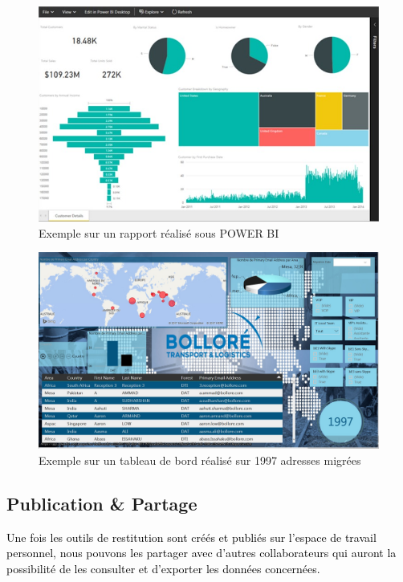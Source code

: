 \documentclass[a4paper,12pt]{report}
\begin{document}
\begin{figure}[H]
	\begin{center}
		\includegraphics[width=1\linewidth]{Projet_O365/rapport_bi}
\end{center}
	\caption{Exemple sur un rapport réalisé sous POWER BI }
	\label{fig:20}	
\end{figure}

\begin{figure}[H]
	\begin{center}
		\includegraphics[width=1\linewidth]{Projet_O365/TB1}
\end{center}
	\caption{Exemple sur un tableau de bord réalisé sur 1997 adresses migrées }
	\label{fig:21}	
\end{figure}


\subsection*{Publication \& Partage }
\textcolor{black}{Une fois les outils de restitution sont créés et publiés sur l’espace de travail personnel, nous pouvons les partager avec d’autres collaborateurs qui auront la possibilité de les consulter et d’exporter les données concernées.}
~~\\
\end{document}
